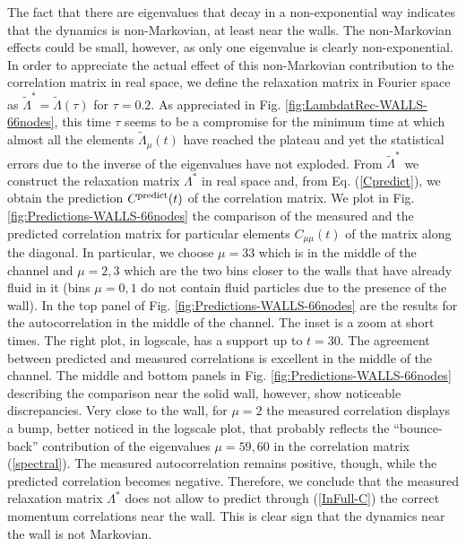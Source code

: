 \documentclass[b5paper,openright,11pt]{book}
\begin{document}
The fact  that there are  eigenvalues that decay in  a non-exponential
way indicates  that the dynamics  is non-Markovian, at least  near the
walls. The non-Markovian effects could  be small, however, as only one
eigenvalue  is clearly  non-exponential.  In  order to  appreciate the
actual effect  of this  non-Markovian contribution to  the correlation
matrix in real space, we define the relaxation matrix in Fourier space
as   $\tilde{\Lambda}^*=\tilde{\Lambda}(\tau)$  for   $\tau=0.2$.   As
appreciated in Fig.   \ref{fig:LambdatRec-WALLS-66nodes}, this time
$\tau$ seems to  be a compromise for the minimum  time at which almost
all the elements $\tilde{\Lambda}_\mu(t)$ have reached the plateau and
yet the statistical errors due to  the inverse of the eigenvalues have
not exploded.   From $\tilde{\Lambda}^*$  we construct  the relaxation
matrix $\Lambda^*$ in  real space and, from  Eq.  (\ref{Cpredict}), we
obtain the prediction $C^{\rm  predict}(t)$ of the correlation matrix.
We plot in Fig. \ref{fig:Predictions-WALLS-66nodes} the  comparison of the measured and the
predicted correlation matrix  for particular elements $C_{\mu\mu}(t)$
of the matrix  along the diagonal.  In particular,  we choose $\mu=33$
which is in the middle of the  channel and $\mu=2,3$ which are the two
bins closer to the walls that have already fluid in it (bins $\mu=0,1$
do not contain  fluid particles due to the presence  of the wall).  In
the  top  panel  of  Fig.   \ref{fig:Predictions-WALLS-66nodes} are  the  results  for  the
autocorrelation in the middle of  the channel. The inset is a zoom at short times. The right plot, in logscale,
has  a support  up  to  $t=30$. The  agreement  between predicted  and
measured correlations is excellent in  the middle of the channel.  The
middle  and  bottom  panels  in Fig.   \ref{fig:Predictions-WALLS-66nodes}  describing  the
comparison   near   the   solid   wall,   however,   show   noticeable
discrepancies.   Very close  to  the wall,  for  $\mu=2$ the  measured
correlation displays  a bump,  better noticed  in the  logscale plot,
that  probably  reflects  the   ``bounce-back''  contribution  of  the
eigenvalues  $\mu=59,60$ in  the correlation  matrix (\ref{spectral}).
The  measured  autocorrelation  remains positive,  though,  while  the
predicted correlation  becomes negative.  Therefore, we  conclude that
the measured relaxation  matrix $\Lambda^*$ does not  allow to predict
through (\ref{InFull-C})  the correct  momentum correlations  near the
wall.   This is  clear sign  that the  dynamics near  the wall  is not
Markovian.
\end{document}
